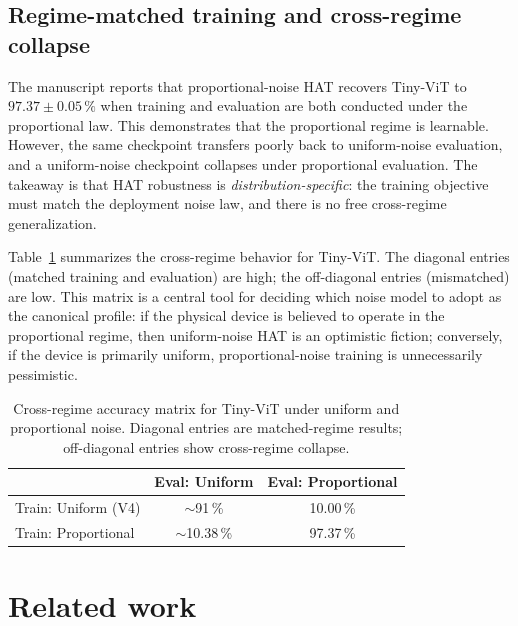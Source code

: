 \subsection{Regime-matched training and cross-regime collapse}

The manuscript reports that proportional-noise HAT recovers Tiny-ViT to $97.37\pm0.05\,\%$ when training and evaluation are both conducted under the proportional law. This demonstrates that the proportional regime is learnable. However, the same checkpoint transfers poorly back to uniform-noise evaluation, and a uniform-noise checkpoint collapses under proportional evaluation. The takeaway is that HAT robustness is \emph{distribution-specific}: the training objective must match the deployment noise law, and there is no free cross-regime generalization.

Table~\ref{tab:noise-regime-matrix} summarizes the cross-regime behavior for Tiny-ViT. The diagonal entries (matched training and evaluation) are high; the off-diagonal entries (mismatched) are low. This matrix is a central tool for deciding which noise model to adopt as the canonical profile: if the physical device is believed to operate in the proportional regime, then uniform-noise HAT is an optimistic fiction; conversely, if the device is primarily uniform, proportional-noise training is unnecessarily pessimistic.

\begin{table}[t]
    \centering
    \caption{Cross-regime accuracy matrix for Tiny-ViT under uniform and proportional noise. Diagonal entries are matched-regime results; off-diagonal entries show cross-regime collapse.}
    \label{tab:noise-regime-matrix}
    \small
    \begin{tabular}{lcc}
        \toprule
        & \textbf{Eval: Uniform} & \textbf{Eval: Proportional} \\
        \midrule
        Train: Uniform (V4) & $\sim$91\,\% & 10.00\,\% \\
        Train: Proportional & $\sim$10.38\,\% & 97.37\,\% \\
        \bottomrule
    \end{tabular}
\end{table}

\section{Related work}
\label{sec:literature-comparison}

